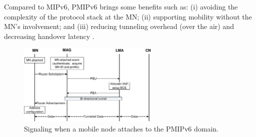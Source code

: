 Compared to MIPv6, PMIPv6 brings some benefits such as: (i) avoiding the complexity of the protocol stack at the MN; (ii) supporting mobility without the MN's involvement; and (iii) reducing tunneling overhead (over the air) and decreasing handover latency \cite{HO_comparison_Lee}.
\begin{figure}[h!] 
 \begin{center} 
 \includegraphics[width=0.60\textwidth]{./Part1/Chapter2/figures/c3_pmip_registration.eps} 
    \caption[Signaling when a mobile node attaches to the PMIPv6 domain]{Signaling when a mobile node attaches to the PMIPv6 domain.}
     \label{fig:c3_pmip_registration}
  \end{center} 
\end{figure}

